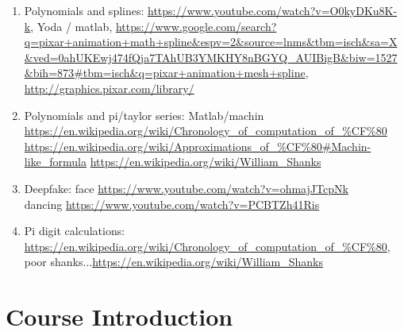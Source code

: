 \documentclass{article}
\begin{document}
\begin{enumerate}
\item Polynomials and splines: \url{https://www.youtube.com/watch?v=O0kyDKu8K-k}, Yoda / matlab, \url{https://www.google.com/search?q=pixar+animation+math+spline&espv=2&source=lnms&tbm=isch&sa=X&ved=0ahUKEwj474fQja7TAhUB3YMKHY8nBGYQ_AUIBigB&biw=1527&bih=873#tbm=isch&q=pixar+animation+mesh+spline}, \url{http://graphics.pixar.com/library/}
\item Polynomials and pi/taylor series: Matlab/machin \url{https://en.wikipedia.org/wiki/Chronology_of_computation_of_%CF%80} 
\url{https://en.wikipedia.org/wiki/Approximations_of_%CF%80#Machin-like_formula}
\url{https://en.wikipedia.org/wiki/William_Shanks}
\item Deepfake: face \url{https://www.youtube.com/watch?v=ohmajJTcpNk} \\
dancing \url{https://www.youtube.com/watch?v=PCBTZh41Ris}
\item Pi digit calculations: \url{https://en.wikipedia.org/wiki/Chronology_of_computation_of_%CF%80}, poor shanks...\url{https://en.wikipedia.org/wiki/William_Shanks}
\end{enumerate}


\section{Course Introduction}
\end{document}
